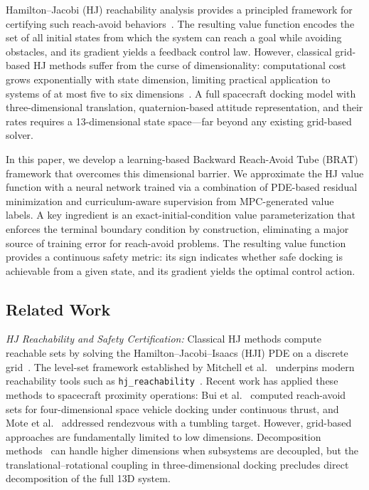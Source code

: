 \documentclass[letterpaper, 10 pt, conference]{ieeeconf}
\begin{document}
Hamilton--Jacobi (HJ) reachability analysis provides a principled framework for certifying such reach-avoid behaviors~\cite{mitchell2005, bansal2017hjsurvey}. The resulting value function encodes the set of all initial states from which the system can reach a goal while avoiding obstacles, and its gradient yields a feedback control law. However, classical grid-based HJ methods suffer from the curse of dimensionality: computational cost grows exponentially with state dimension, limiting practical application to systems of at most five to six dimensions~\cite{mitchell2005}. A full spacecraft docking model with three-dimensional translation, quaternion-based attitude representation, and their rates requires a 13-dimensional state space---far beyond any existing grid-based solver.

In this paper, we develop a learning-based Backward Reach-Avoid Tube (BRAT) framework that overcomes this dimensional barrier. We approximate the HJ value function with a neural network trained via a combination of PDE-based residual minimization and curriculum-aware supervision from MPC-generated value labels. A key ingredient is an exact-initial-condition value parameterization that enforces the terminal boundary condition by construction, eliminating a major source of training error for reach-avoid problems. The resulting value function provides a continuous safety metric: its sign indicates whether safe docking is achievable from a given state, and its gradient yields the optimal control action.

\subsection{Related Work}

\textit{HJ Reachability and Safety Certification:}
Classical HJ methods compute reachable sets by solving the Hamilton--Jacobi--Isaacs (HJI) PDE on a discrete grid~\cite{mitchell2005, lygeros2004}. The level-set framework established by Mitchell et al.~\cite{mitchell2005} underpins modern reachability tools such as \texttt{hj\_reachability}~\cite{hjreachability}. Recent work has applied these methods to spacecraft proximity operations: Bui et al.~\cite{bui2022} computed reach-avoid sets for four-dimensional space vehicle docking under continuous thrust, and Mote et al.~\cite{mote2023} addressed rendezvous with a tumbling target. However, grid-based approaches are fundamentally limited to low dimensions. Decomposition methods~\cite{chen2018decomposition} can handle higher dimensions when subsystems are decoupled, but the translational--rotational coupling in three-dimensional docking precludes direct decomposition of the full 13D system.
\end{document}
